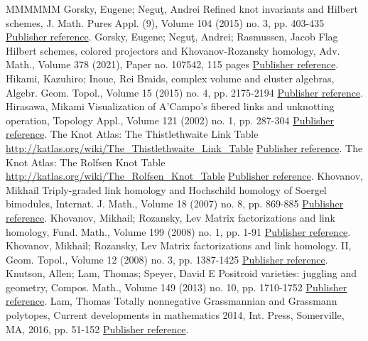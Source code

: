 \documentclass[11pt]{article}
\theoremstyle{definition}
\numberwithin{equation}{section}
\begin{document}
\begin{thebibliography}{MMMMMM}
 Gorsky, Eugene; Neguţ, Andrei Refined knot invariants and Hilbert schemes, J. Math. Pures Appl. (9), Volume 104 (2015) no. 3, pp. 403-435 \href{https://alco.centre-mersenne.org/articles/10.5802/alco.345/#GN}{Publisher reference}.
 Gorsky, Eugene; Neguţ, Andrei; Rasmussen, Jacob Flag Hilbert schemes, colored projectors and Khovanov-Rozansky homology, Adv. Math., Volume 378 (2021), Paper no. 107542, 115 pages \href{https://alco.centre-mersenne.org/articles/10.5802/alco.345/#GNR}{Publisher reference}.
 Hikami, Kazuhiro; Inoue, Rei Braids, complex volume and cluster algebras, Algebr. Geom. Topol., Volume 15 (2015) no. 4, pp. 2175-2194 \href{https://alco.centre-mersenne.org/articles/10.5802/alco.345/#HiIn}{Publisher reference}.
 Hirasawa, Mikami Visualization of A’Campo’s fibered links and unknotting operation, Topology Appl., Volume 121 (2002) no. 1, pp. 287-304 \href{https://alco.centre-mersenne.org/articles/10.5802/alco.345/#Hirasawa}{Publisher reference}.
 The Knot Atlas: The Thistlethwaite Link Table \url{http://katlas.org/wiki/The_Thistlethwaite_Link_Table} \href{https://alco.centre-mersenne.org/articles/10.5802/alco.345/#KAT}{Publisher reference}.
 The Knot Atlas: The Rolfsen Knot Table \url{http://katlas.org/wiki/The_Rolfsen_Knot_Table} \href{https://alco.centre-mersenne.org/articles/10.5802/alco.345/#KAT_knot}{Publisher reference}.
 Khovanov, Mikhail Triply-graded link homology and Hochschild homology of Soergel bimodules, Internat. J. Math., Volume 18 (2007) no. 8, pp. 869-885 \href{https://alco.centre-mersenne.org/articles/10.5802/alco.345/#KhoSoe}{Publisher reference}.
 Khovanov, Mikhail; Rozansky, Lev Matrix factorizations and link homology, Fund. Math., Volume 199 (2008) no. 1, pp. 1-91 \href{https://alco.centre-mersenne.org/articles/10.5802/alco.345/#KR1}{Publisher reference}.
 Khovanov, Mikhail; Rozansky, Lev Matrix factorizations and link homology. II, Geom. Topol., Volume 12 (2008) no. 3, pp. 1387-1425 \href{https://alco.centre-mersenne.org/articles/10.5802/alco.345/#KR2}{Publisher reference}.
 Knutson, Allen; Lam, Thomas; Speyer, David E Positroid varieties: juggling and geometry, Compos. Math., Volume 149 (2013) no. 10, pp. 1710-1752 \href{https://alco.centre-mersenne.org/articles/10.5802/alco.345/#KLS}{Publisher reference}.
 Lam, Thomas Totally nonnegative Grassmannian and Grassmann polytopes, Current developments in mathematics 2014, Int. Press, Somerville, MA, 2016, pp. 51-152 \href{https://alco.centre-mersenne.org/articles/10.5802/alco.345/#LamCDM}{Publisher reference}.

\end{thebibliography}
\end{document}
